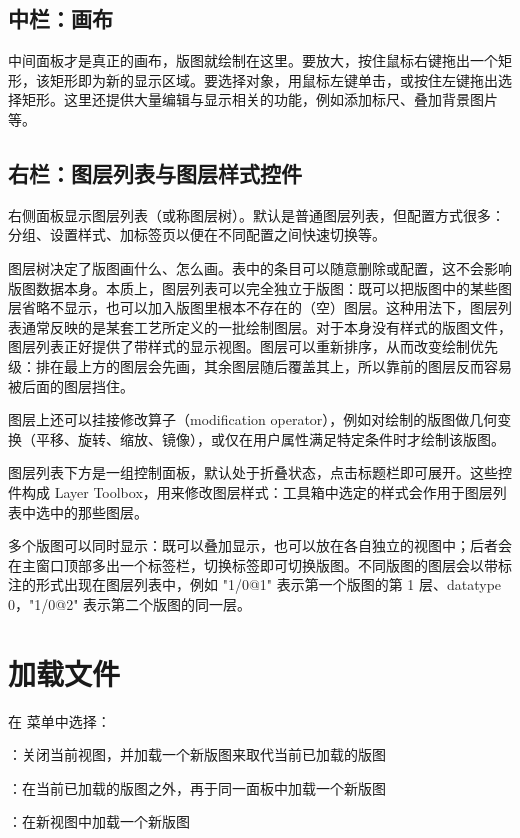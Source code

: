 \subsection{中栏：画布}

中间面板才是真正的画布，版图就绘制在这里。要放大，按住鼠标右键拖出一个矩形，该矩形即为新的显示区域。要选择对象，用鼠标左键单击，或按住左键拖出选择矩形。这里还提供大量编辑与显示相关的功能，例如添加标尺、叠加背景图片等。

\subsection{右栏：图层列表与图层样式控件}

右侧面板显示图层列表（或称图层树）。默认是普通图层列表，但配置方式很多：分组、设置样式、加标签页以便在不同配置之间快速切换等。

图层树决定了版图画什么、怎么画。表中的条目可以随意删除或配置，这不会影响版图数据本身。本质上，图层列表可以完全独立于版图：既可以把版图中的某些图层省略不显示，也可以加入版图里根本不存在的（空）图层。这种用法下，图层列表通常反映的是某套工艺所定义的一批绘制图层。对于本身没有样式的版图文件，图层列表正好提供了带样式的显示视图。图层可以重新排序，从而改变绘制优先级：排在最上方的图层会先画，其余图层随后覆盖其上，所以靠前的图层反而容易被后面的图层挡住。

图层上还可以挂接修改算子（modification operator），例如对绘制的版图做几何变换（平移、旋转、缩放、镜像），或仅在用户属性满足特定条件时才绘制该版图。

图层列表下方是一组控制面板，默认处于折叠状态，点击标题栏即可展开。这些控件构成 Layer Toolbox，用来修改图层样式：工具箱中选定的样式会作用于图层列表中选中的那些图层。

多个版图可以同时显示：既可以叠加显示，也可以放在各自独立的视图中；后者会在主窗口顶部多出一个标签栏，切换标签即可切换版图。不同版图的图层会以带标注的形式出现在图层列表中，例如 "1/0@1" 表示第一个版图的第 1 层、datatype 0，"1/0@2" 表示第二个版图的同一层。

\section{加载文件}\label{sec:loading}

在  菜单中选择：

\begin{kldesc}
\item {}：关闭当前视图，并加载一个新版图来取代当前已加载的版图
\item {}：在当前已加载的版图之外，再于同一面板中加载一个新版图
\item {}：在新视图中加载一个新版图
\end{kldesc}

